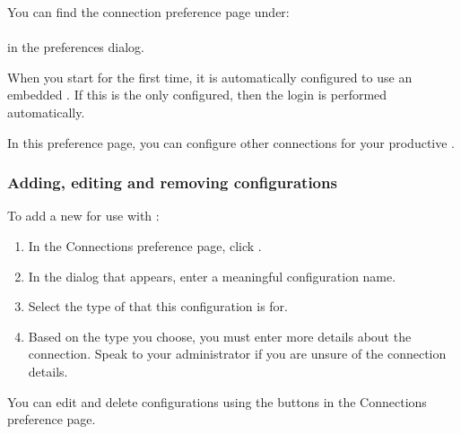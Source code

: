 


You can find the \gddb{} connection preference page under:\\
\\
in the preferences dialog.

When you start \app{} for the first time, it is automatically configured to use an embedded \gddb{}. If this is the only \gddb{} configured, then the \gddb{} login is performed automatically. 

In this preference page, you can configure other \gddb{} connections for your productive \gddb{}. 



\subsubsection{Adding, editing and removing \gddb{} configurations}

To add a new \gddb{} for use with \app{}:

\begin{enumerate}
\item In the \gddb{} Connections preference page, click .
\item In the dialog that appears, enter a meaningful configuration name.
\item Select the type of \gddb{} that this configuration is for. 
\item Based on the \gddb{} type you choose, you must enter more details about the \gddb{} connection. Speak to your \gddb{} administrator if you are unsure of the connection details. 
\end{enumerate}

You can edit and delete \gddb{} configurations using the buttons in the \gddb{} Connections preference page. 
